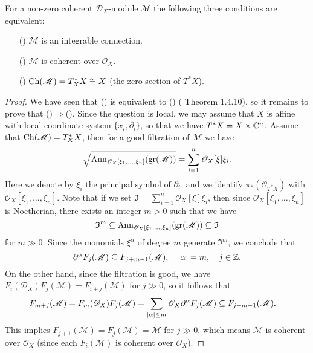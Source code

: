 \begin{proposition}
For a non-zero coherent $\mathscr{D}_X$-module $\mathscr{M}$ the following three conditions are equivalent:
\begin{enumerate}
    \item[(\rmnum{1})] $\mathscr{M}$ is an integrable connection.
    \item[(\rmnum{2})] $\mathscr{M}$ is coherent over $\mathscr{O}_X$.
    \item[(\rmnum{3})] $\mathrm{Ch}(\mathscr{M})=T^*_XX\cong X$ (the zero section of $T^*X$).
\end{enumerate}
\end{proposition}
\begin{proof}
We have seen that () is equivalent to () (\cite{hotta_Dmodule} Theorem 1.4.10), so it remains to prove that ()$\Rightarrow$(). Since the question is local, we may assume that $X$ is affine with local coordinate system $\{x_i,\partial_i\}$, so that we have $T^*X=X\times\mathbb{C}^n$. Assume that $\mathrm{Ch}(\mathscr{M})=T^*_XX$, then for a good filtration of $\mathscr{M}$ we have
\[\sqrt{\mathrm{Ann}_{\mathscr{O}_X[\xi_1,\dots,\xi_n]}(\mathrm{gr}(\mathscr{M}))}=\sum_{i=1}^{n}\mathscr{O}_X[\xi]\xi_i.\]
Here we denote by $\xi_i$ the principal symbol of $\partial_i$, and we identify $\pi_*(\mathscr{O}_{T^*X})$ with $\mathscr{O}_X[\xi_1,\dots,\xi_n]$. Note that if we set $\mathfrak{I}=\sum_{i=1}^{n}\mathscr{O}_X[\xi]\xi_i$, then since $\mathscr{O}_X[\xi_1,\dots,\xi_n]$ is Noetherian, there exists an integer $m>0$ such that we have
\[\mathfrak{I}^m\subseteq\mathrm{Ann}_{\mathscr{O}_X[\xi_1,\dots,\xi_n]}(\mathrm{gr}(\mathscr{M}))\subseteq\mathfrak{I}\]
for $m\gg 0$. Since the monomials $\xi^\alpha$ of degree $m$ generate $\mathfrak{I}^m$, we conclude that
\[\partial^\alpha F_j(\mathscr{M})\subseteq F_{j+m-1}(\mathscr{M}),\quad |\alpha|=m,\quad j\in\mathbb{Z}.\]
On the other hand, since the filtration is good, we have $F_i(\mathscr{D}_X)F_j(\mathscr{M})=F_{i+j}(\mathscr{M})$ for $j\gg 0$, so it follows that
\begin{align*}
F_{m+j}(\mathscr{M})&=F_m(\mathscr{D}_X)F_j(\mathscr{M})=\sum_{|\alpha|\leq m}\mathscr{O}_X\partial^\alpha F_j(\mathscr{M})\subseteq F_{j+m-1}(\mathscr{M}).
\end{align*}
This implies $F_{j+1}(\mathscr{M})=F_j(\mathscr{M})=\mathscr{M}$ for $j\gg 0$, which means $\mathscr{M}$ is coherent over $\mathscr{O}_X$ (since each $F_i(\mathscr{M})$ is coherent over $\mathscr{O}_X$).
\end{proof}

